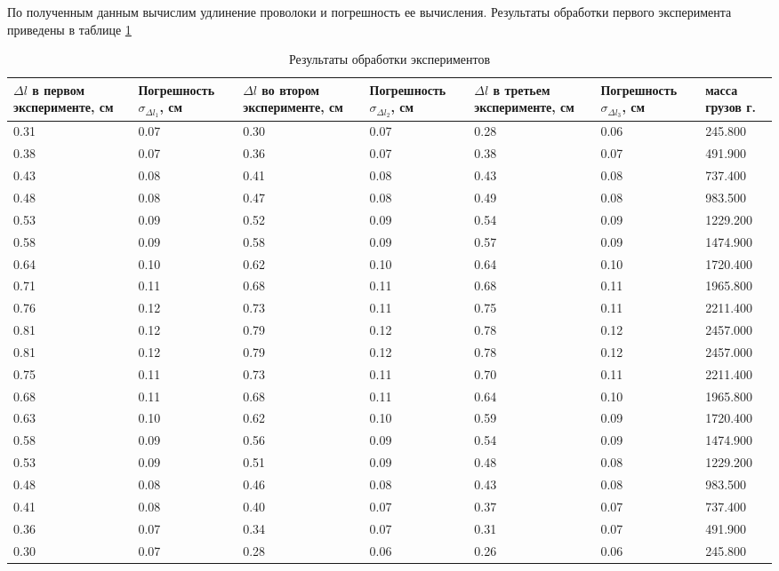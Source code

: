 \documentclass[a4paper, 12pt]{article}
\begin{document}
По полученным данным вычислим удлинение проволоки и погрешность ее вычисления. Результаты обработки первого эксперимента приведены в таблице \ref{tabl:data2}

\begin{table}
    \centering
    \begin{tabular}{|p{4em}|p{6em}||p{4em}|p{6em}||p{4em}|p{6em}|p{4em}|}
        \hline
        $\Delta l$ в первом эксперименте, см & Погрешность $\sigma_{\Delta l_1}$, см & $\Delta l$ во втором эксперименте, см  & Погрешность $\sigma_{\Delta l_2}$, см & $\Delta l$ в третьем эксперименте, см & Погрешность $\sigma_{\Delta l_3}$, см & масса грузов г. \\ \hline
        0.31 & 0.07 & 0.30 & 0.07  & 0.28 & 0.06  & 245.800 	 \\ \hline
        0.38 & 0.07 & 0.36 & 0.07  & 0.38 & 0.07  & 491.900 	 \\ \hline
        0.43 & 0.08 & 0.41 & 0.08  & 0.43 & 0.08  & 737.400 	 \\ \hline
        0.48 & 0.08 & 0.47 & 0.08  & 0.49 & 0.08  & 983.500 	 \\ \hline
        0.53 & 0.09 & 0.52 & 0.09  & 0.54 & 0.09  & 1229.200 	 \\ \hline
        0.58 & 0.09 & 0.58 & 0.09  & 0.57 & 0.09  & 1474.900 	 \\ \hline
        0.64 & 0.10 & 0.62 & 0.10  & 0.64 & 0.10  & 1720.400 	 \\ \hline
        0.71 & 0.11 & 0.68 & 0.11  & 0.68 & 0.11  & 1965.800 	 \\ \hline
        0.76 & 0.12 & 0.73 & 0.11  & 0.75 & 0.11  & 2211.400 	 \\ \hline
        0.81 & 0.12 & 0.79 & 0.12  & 0.78 & 0.12  & 2457.000 	 \\ \hline
        0.81 & 0.12 & 0.79 & 0.12  & 0.78 & 0.12  & 2457.000 	 \\ \hline
        0.75 & 0.11 & 0.73 & 0.11  & 0.70 & 0.11  & 2211.400 	 \\ \hline
        0.68 & 0.11 & 0.68 & 0.11  & 0.64 & 0.10  & 1965.800 	 \\ \hline
        0.63 & 0.10 & 0.62 & 0.10  & 0.59 & 0.09  & 1720.400 	 \\ \hline
        0.58 & 0.09 & 0.56 & 0.09  & 0.54 & 0.09  & 1474.900 	 \\ \hline
        0.53 & 0.09 & 0.51 & 0.09  & 0.48 & 0.08  & 1229.200 	 \\ \hline
        0.48 & 0.08 & 0.46 & 0.08  & 0.43 & 0.08  & 983.500 	 \\ \hline
        0.41 & 0.08 & 0.40 & 0.07  & 0.37 & 0.07  & 737.400 	 \\ \hline
        0.36 & 0.07 & 0.34 & 0.07  & 0.31 & 0.07  & 491.900 	 \\ \hline
        0.30 & 0.07 & 0.28 & 0.06  & 0.26 & 0.06  & 245.800 	 \\ \hline
    \end{tabular}
    \caption{Результаты обработки экспериментов}
    \label{tabl:data2}
\end{table}
\end{document}

